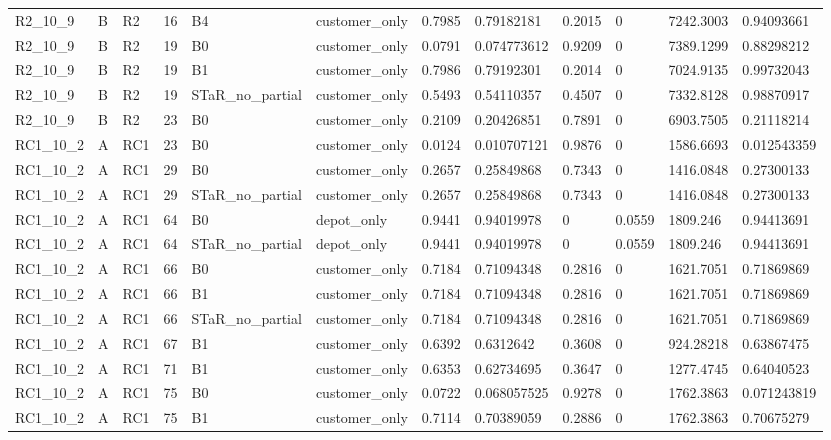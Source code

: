 \begin{longtable}{llllllllllll}
R2\_10\_9 & B & R2 & 16 & B4 & customer\_only & 0.7985 & 0.79182181 & 0.2015 & 0 & 7242.3003 & 0.94093661 \\
R2\_10\_9 & B & R2 & 19 & B0 & customer\_only & 0.0791 & 0.074773612 & 0.9209 & 0 & 7389.1299 & 0.88298212 \\
R2\_10\_9 & B & R2 & 19 & B1 & customer\_only & 0.7986 & 0.79192301 & 0.2014 & 0 & 7024.9135 & 0.99732043 \\
R2\_10\_9 & B & R2 & 19 & STaR\_no\_partial & customer\_only & 0.5493 & 0.54110357 & 0.4507 & 0 & 7332.8128 & 0.98870917 \\
R2\_10\_9 & B & R2 & 23 & B0 & customer\_only & 0.2109 & 0.20426851 & 0.7891 & 0 & 6903.7505 & 0.21118214 \\
RC1\_10\_2 & A & RC1 & 23 & B0 & customer\_only & 0.0124 & 0.010707121 & 0.9876 & 0 & 1586.6693 & 0.012543359 \\
RC1\_10\_2 & A & RC1 & 29 & B0 & customer\_only & 0.2657 & 0.25849868 & 0.7343 & 0 & 1416.0848 & 0.27300133 \\
RC1\_10\_2 & A & RC1 & 29 & STaR\_no\_partial & customer\_only & 0.2657 & 0.25849868 & 0.7343 & 0 & 1416.0848 & 0.27300133 \\
RC1\_10\_2 & A & RC1 & 64 & B0 & depot\_only & 0.9441 & 0.94019978 & 0 & 0.0559 & 1809.246 & 0.94413691 \\
RC1\_10\_2 & A & RC1 & 64 & STaR\_no\_partial & depot\_only & 0.9441 & 0.94019978 & 0 & 0.0559 & 1809.246 & 0.94413691 \\
RC1\_10\_2 & A & RC1 & 66 & B0 & customer\_only & 0.7184 & 0.71094348 & 0.2816 & 0 & 1621.7051 & 0.71869869 \\
RC1\_10\_2 & A & RC1 & 66 & B1 & customer\_only & 0.7184 & 0.71094348 & 0.2816 & 0 & 1621.7051 & 0.71869869 \\
RC1\_10\_2 & A & RC1 & 66 & STaR\_no\_partial & customer\_only & 0.7184 & 0.71094348 & 0.2816 & 0 & 1621.7051 & 0.71869869 \\
RC1\_10\_2 & A & RC1 & 67 & B1 & customer\_only & 0.6392 & 0.6312642 & 0.3608 & 0 & 924.28218 & 0.63867475 \\
RC1\_10\_2 & A & RC1 & 71 & B1 & customer\_only & 0.6353 & 0.62734695 & 0.3647 & 0 & 1277.4745 & 0.64040523 \\
RC1\_10\_2 & A & RC1 & 75 & B0 & customer\_only & 0.0722 & 0.068057525 & 0.9278 & 0 & 1762.3863 & 0.071243819 \\
RC1\_10\_2 & A & RC1 & 75 & B1 & customer\_only & 0.7114 & 0.70389059 & 0.2886 & 0 & 1762.3863 & 0.70675279 \\

\end{longtable}
